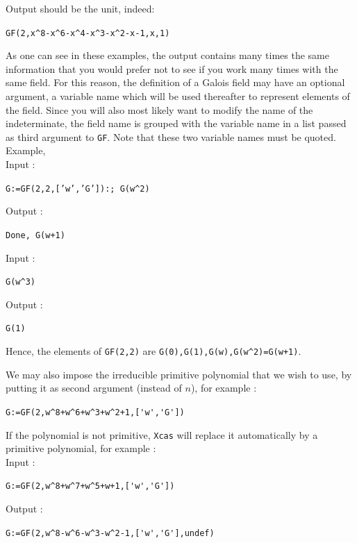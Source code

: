 \documentclass[a4paper,11pt]{book}
\begin{document}
Output should be the unit, indeed:
\begin{center}
{\tt GF(2,x\verb|^|8-x\verb|^|6-x\verb|^|4-x\verb|^|3-x\verb|^|2-x-1,x,1)}\end{center}
As one can see in these examples, the output contains many times the same
information that you would prefer not to see
if you work many times with the same field. For this reason,
the definition of a Galois field may have an optional argument,
a variable name which will be used thereafter to represent elements
of the field. Since you will also most
likely want to modify the name of the indeterminate, the field
name is grouped with the variable name in a list
passed as third argument to {\tt GF}.
Note that these two variable names must be quoted.\\
Example,\\
Input :
\begin{center}{\tt G:=GF(2,2,['w','G']):; G(w\verb|^|2)}\end{center}
Output :
\begin{center}{\tt Done, G(w+1)}\end{center}
Input :
\begin{center}{\tt G(w\verb|^|3)}\end{center}
Output :
\begin{center}{\tt G(1)}\end{center}
Hence, the elements of {\tt GF(2,2)} are
{\tt G(0),G(1),G(w),G(w\verb|^|2)=G(w+1)}.

We may also impose the irreducible primitive polynomial that we wish
to use, by putting it as second argument (instead of $n$), 
for example :
\begin{center}\verb|G:=GF(2,w^8+w^6+w^3+w^2+1,['w','G'])|\end{center}
If the polynomial is not primitive, {\tt Xcas} will replace it
automatically by a primitive polynomial, for example :\\
Input :
\begin{center}\verb|G:=GF(2,w^8+w^7+w^5+w+1,['w','G'])|\end{center}
Output :
\begin{center}\verb|G:=GF(2,w^8-w^6-w^3-w^2-1,['w','G'],undef)|\end{center}
\end{document}
